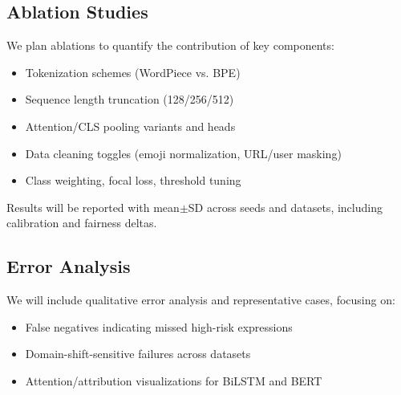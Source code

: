 \documentclass[conference]{IEEEtran}
\begin{document}
\subsection{Ablation Studies}

We plan ablations to quantify the contribution of key components:
\begin{itemize}
  \item Tokenization schemes (WordPiece vs. BPE)
  \item Sequence length truncation (128/256/512)
  \item Attention/CLS pooling variants and heads
  \item Data cleaning toggles (emoji normalization, URL/user masking)
  \item Class weighting, focal loss, threshold tuning
\end{itemize}
Results will be reported with mean\(\pm\)SD across seeds and datasets, including calibration and fairness deltas.

\subsection{Error Analysis}

We will include qualitative error analysis and representative cases, focusing on:
\begin{itemize}
  \item False negatives indicating missed high-risk expressions
  \item Domain-shift-sensitive failures across datasets
  \item Attention/attribution visualizations for BiLSTM and BERT
\end{itemize}
\end{document}
